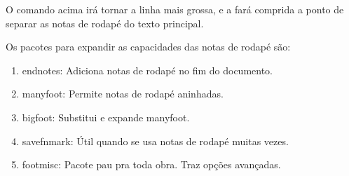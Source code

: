 O comando acima irá tornar a linha mais grossa, e a fará comprida a ponto de
separar as notas de rodapé do texto principal.

Os pacotes para expandir as capacidades das notas de rodapé são:
\begin{enumerate}
	\item endnotes: Adiciona notas de rodapé no fim do documento.
	\item manyfoot: Permite notas de rodapé aninhadas.
	\item bigfoot: Substitui e expande manyfoot.
	\item savefnmark: Útil quando se usa notas de rodapé muitas vezes.
	\item footmisc: Pacote pau pra toda obra. Traz opções avançadas.
\end{enumerate}

\newpage

